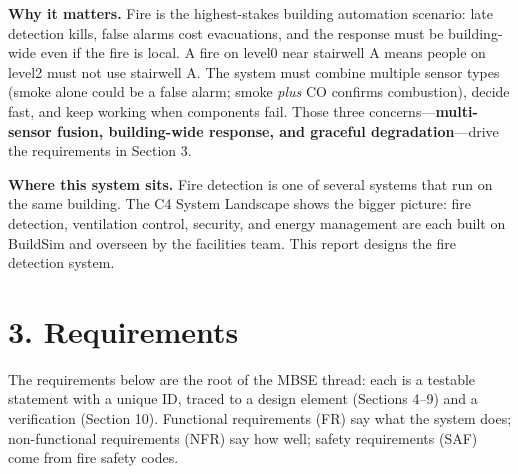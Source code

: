 \documentclass[11pt]{article}
\begin{document}
\textbf{Why it matters.} Fire is the highest-stakes building automation scenario: late detection kills, false alarms cost evacuations, and the response must be building-wide even if the fire is local. A fire on level0 near stairwell A means people on level2 must not use stairwell A. The system must combine multiple sensor types (smoke alone could be a false alarm; smoke \emph{plus} CO confirms combustion), decide fast, and keep working when components fail. Those three concerns---\textbf{multi-sensor fusion, building-wide response, and graceful degradation}---drive the requirements in Section 3.

\textbf{Where this system sits.} Fire detection is one of several systems that run on the same building. The C4 System Landscape shows the bigger picture: fire detection, ventilation control, security, and energy management are each built on BuildSim and overseen by the facilities team. This report designs the fire detection system.


\section{3. Requirements}

The requirements below are the root of the MBSE thread: each is a testable statement with a unique ID, traced to a design element (Sections 4--9) and a verification (Section 10). Functional requirements (FR) say what the system does; non-functional requirements (NFR) say how well; safety requirements (SAF) come from fire safety codes.
\end{document}

